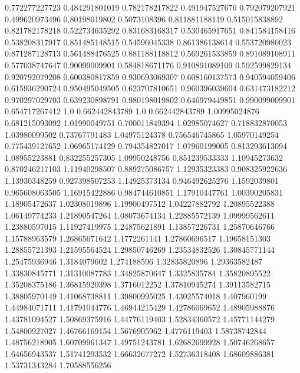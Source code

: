  0.772277227723   0.484291801019
 0.782178217822   0.491947527676
 0.792079207921   0.499620973496
  0.80198019802     0.5073108396
 0.811881188119   0.515015838892
 0.821782178218   0.522734635292
 0.831683168317   0.530465917651
 0.841584158416   0.538208317917
 0.851485148515    0.54596045338
 0.861386138614   0.553720980023
 0.871287128713   0.561488476525
 0.881188118812   0.569261533859
 0.891089108911   0.577038747647
  0.90099009901   0.584818671176
 0.910891089109   0.592599829134
 0.920792079208   0.600380817859
 0.930693069307   0.608160137573
 0.940594059406   0.615936290724
 0.950495049505   0.623707810651
 0.960396039604   0.631473182212
 0.970297029703   0.639230898791
 0.980198019802   0.646979449851
 0.990099009901   0.654717267412
            1.0   0.662442843789
            1.0   0.662442843789
  1.00995024876   0.681215093092
  1.01990049751   0.700011849394
  1.02985074627   0.718832870053
  1.03980099502    0.73767791483
  1.04975124378   0.756546745865
  1.05970149254   0.775439127652
  1.06965174129   0.794354827017
  1.07960199005   0.813293613094
  1.08955223881   0.832255257305
  1.09950248756   0.851239533333
  1.10945273632   0.870246217103
  1.11940298507   0.889275086757
  1.12935323383   0.908325922636
  1.13930348259   0.927398507253
  1.14925373134   0.946492625276
   1.1592039801   0.965608063505
  1.16915422886   0.984744610851
  1.17910447761    1.00390205831
  1.18905472637    1.02308019896
  1.19900497512    1.04227882792
  1.20895522388    1.06149774233
  1.21890547264    1.08073674134
  1.22885572139    1.09999562611
  1.23880597015    1.11927419975
  1.24875621891    1.13857226731
  1.25870646766    1.15788963579
  1.26865671642     1.1772261141
  1.27860696517    1.19658151303
  1.28855721393    1.21595564524
  1.29850746269    1.23534832526
  1.30845771144    1.25475936946
   1.3184079602      1.274188596
  1.32835820896    1.29363582487
  1.33830845771    1.31310087783
  1.34825870647     1.3325835784
  1.35820895522    1.35208375186
  1.36815920398     1.3716012252
  1.37810945274    1.39113582715
  1.38805970149    1.41068738811
  1.39800995025    1.43025574018
    1.407960199    1.44984071711
  1.41791044776    1.46944215429
  1.42786069652    1.48905988876
  1.43781094527    1.50869375916
  1.44776119403    1.52834360572
  1.45771144279    1.54800927027
  1.46766169154     1.5676905962
   1.4776119403    1.58738742844
  1.48756218905    1.60709961347
  1.49751243781    1.62682699928
  1.50746268657    1.64656943537
  1.51741293532    1.66632677272
  1.52736318408    1.68609886381
  1.53731343284    1.70588556256
